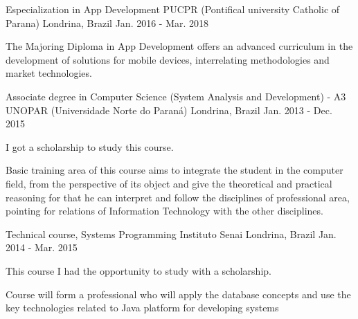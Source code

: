 

\begin{cventries}

  \cventry
    {Especialization in App Development} %
    {PUCPR (Pontifical university Catholic of Parana)} %
    {Londrina, Brazil} %
    {Jan. 2016 - Mar. 2018} %
    {
      \begin{cvitems} %
\item {The Majoring Diploma in App Development offers an advanced curriculum in the development of solutions for mobile devices, interrelating methodologies and market technologies.}
      \end{cvitems}
    }



  \cventry
    {Associate degree in Computer Science (System Analysis and Development) - A3} %
    {UNOPAR (Universidade Norte do Paraná)} %
    {Londrina, Brazil} %
    {Jan. 2013 - Dec. 2015} %
    {
      \begin{cvitems} %
        \item {I got a scholarship to study this course.}
\item {Basic training area of this course aims to integrate the student in the computer field, from the perspective of its object and give the theoretical and practical reasoning for that he can interpret and follow the disciplines of professional area, pointing for relations of Information Technology with the other disciplines.}
      \end{cvitems}
    }
    
  \cventry
    {Technical course, Systems Programming} %
    {Instituto Senai} %
    {Londrina, Brazil} %
    {Jan. 2014 - Mar. 2015} %
    {
      \begin{cvitems} %
        \item {This course I had the opportunity to study with a scholarship.}
\item {Course will form a professional who will apply the database concepts and use the key technologies related to Java platform for developing systems}
      \end{cvitems}
    }
\end{cventries}
